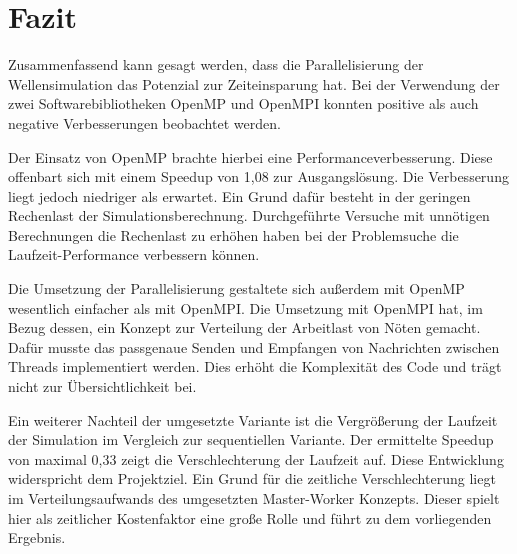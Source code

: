 
\section{Fazit}
Zusammenfassend kann gesagt werden, dass die Parallelisierung der Wellensimulation das Potenzial zur Zeiteinsparung hat. Bei der Verwendung der zwei Softwarebibliotheken OpenMP und OpenMPI konnten positive als auch negative Verbesserungen beobachtet werden.

Der Einsatz von OpenMP brachte hierbei eine Performanceverbesserung. Diese offenbart sich mit einem Speedup von 1,08 zur Ausgangslösung. Die Verbesserung liegt jedoch niedriger als erwartet. Ein Grund dafür besteht in der geringen Rechenlast der Simulationsberechnung. Durchgeführte Versuche mit unnötigen Berechnungen die Rechenlast zu erhöhen haben bei der Problemsuche die Laufzeit-Performance verbessern können.
 
Die Umsetzung der Parallelisierung gestaltete sich außerdem mit OpenMP wesentlich einfacher als mit OpenMPI. Die Umsetzung mit OpenMPI hat, im Bezug dessen, ein Konzept zur Verteilung der Arbeitlast von Nöten gemacht. Dafür musste das passgenaue Senden und Empfangen von Nachrichten zwischen Threads implementiert werden. Dies erhöht die Komplexität des Code und trägt nicht zur Übersichtlichkeit bei. 

Ein weiterer Nachteil der umgesetzte Variante ist die Vergrößerung der Laufzeit der Simulation im Vergleich zur sequentiellen Variante. Der ermittelte Speedup von maximal 0,33 zeigt die Verschlechterung der Laufzeit auf. Diese Entwicklung widerspricht dem Projektziel. Ein Grund für die zeitliche Verschlechterung liegt im Verteilungsaufwands des umgesetzten Master-Worker Konzepts. Dieser spielt hier als zeitlicher Kostenfaktor eine große Rolle und führt zu dem vorliegenden Ergebnis.
